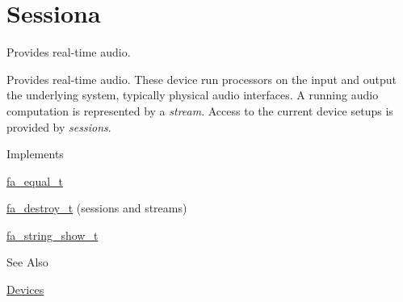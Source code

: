 \hypertarget{group___fa_audio_sessiona}{\section{Sessiona}
\label{group___fa_audio_sessiona}
}


Provides real-\/time audio.  


Provides real-\/time audio. These device run processors on the input and output the underlying system, typically physical audio interfaces. A running audio computation is represented by a {\itshape stream}. Access to the current device setups is provided by {\itshape sessions}.

\begin{DoxyParagraph}{Implements}

\begin{DoxyItemize}
\item \hyperlink{structfa__equal__t}{fa\-\_\-equal\-\_\-t}
\item \hyperlink{structfa__destroy__t}{fa\-\_\-destroy\-\_\-t} (sessions and streams)
\item \hyperlink{structfa__string__show__t}{fa\-\_\-string\-\_\-show\-\_\-t}
\end{DoxyItemize}
\end{DoxyParagraph}
\begin{DoxySeeAlso}{See Also}

\begin{DoxyItemize}
\item \hyperlink{md__devices_Devices}{Devices} 
\end{DoxyItemize}
\end{DoxySeeAlso}
